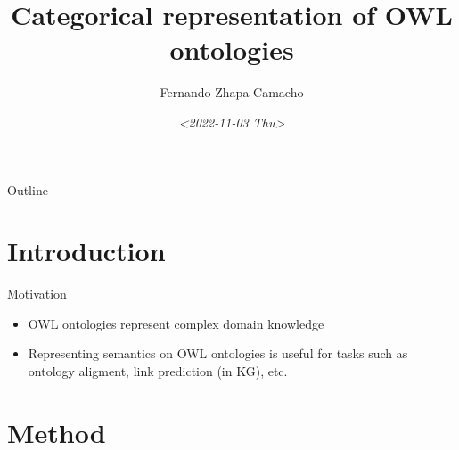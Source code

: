 \documentclass[bigger]{beamer}
\author{Fernando Zhapa-Camacho}
\date{\textit{<2022-11-03 Thu>}}
\title{Categorical representation of OWL ontologies}
\begin{document}
\maketitle
\begin{frame}{Outline}
\tableofcontents
\end{frame}




\section{Introduction}
\label{sec:orgd1839e3}

\begin{frame}[label={sec:orge04952a}]{Motivation}
\begin{itemize}
\item OWL ontologies represent complex domain knowledge
\item Representing semantics on OWL ontologies is useful for tasks such as ontology aligment, link prediction (in KG), etc.
\end{itemize}
\end{frame}


\section{Method}
\label{sec:orga884438}
\end{document}
